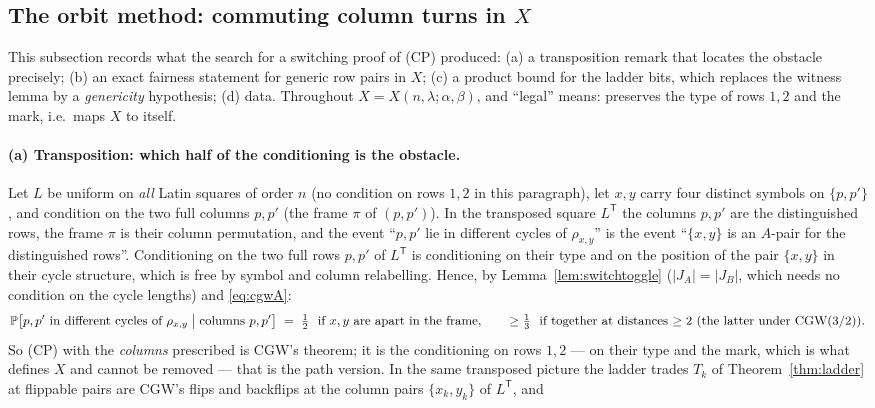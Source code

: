 \subsection{The orbit method: commuting column turns in $X$}
\label{sec:orbit}

This subsection records what the search for a switching proof of (CP)
produced: (a) a transposition remark that locates the obstacle
precisely; (b) an exact fairness statement for generic row pairs in
$X$; (c) a product bound for the ladder bits, which replaces the
witness lemma by a \emph{genericity} hypothesis; (d) data.  Throughout
$X=X(n,\lambda;\alpha,\beta)$, and ``legal'' means: preserves the
type of rows $1,2$ and the mark, i.e.\ maps $X$ to itself.

\paragraph{(a) Transposition: which half of the conditioning is the
obstacle.}  Let $L$ be uniform on \emph{all} Latin squares of order
$n$ (no condition on rows $1,2$ in this paragraph), let $x,y$ carry
four distinct symbols on $\{p,p'\}$, and condition on the two full
columns $p,p'$ (the frame $\pi$ of $(p,p')$).  In the transposed square $L^{\mathsf T}$ the
columns $p,p'$ are the distinguished rows, the frame $\pi$ is their
column permutation, and the event ``$p,p'$ lie in different cycles of
$\rho_{x,y}$'' is the event ``$\{x,y\}$ is an $A$-pair for the
distinguished rows''.  Conditioning on the two full rows $p,p'$ of
$L^{\mathsf T}$ is conditioning on their type and on the position of
the pair $\{x,y\}$ in their cycle structure, which is free by symbol
and column relabelling.  Hence, by Lemma~\ref{lem:switchtoggle}
($|J_A|=|J_B|$, which needs no condition on the cycle lengths) and
\eqref{eq:cgwA}:
\begin{equation}\label{eq:CPcols}
\Pr\bigl[p,p'\text{ in different cycles of }\rho_{x,y}\bigm|\text{columns }p,p'\bigr]
\;=\;\tfrac12\ \text{ if $x,y$ are apart in the frame},\qquad
\ge\tfrac13\ \text{ if together at distances $\ge2$ (the latter under CGW($3/2$))}.
\end{equation}
So (CP) with the \emph{columns} prescribed is CGW's theorem; it is the
conditioning on rows $1,2$ --- on their type and the mark, which is
what defines $X$ and cannot be removed --- that is the path version.
In the same transposed picture the ladder trades $T_k$ of
Theorem~\ref{thm:ladder} at flippable pairs are CGW's flips and
backflips at the column pairs $\{x_k,y_k\}$ of $L^{\mathsf T}$, and
